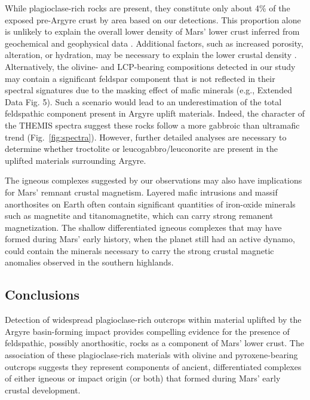 \documentclass[11pt]{article}
\begin{document}
While plagioclase-rich rocks are present, they constitute only about 4\% of the exposed pre-Argyre crust by area based on our detections. This proportion alone is unlikely to explain the overall lower density of Mars' lower crust inferred from geochemical and geophysical data \citep{Baratoux2014, Goossens2017, Knapmeyer-Endrun2021, Drilleau2023, Joshi2023}. Additional factors, such as increased porosity, alteration, or hydration, may be necessary to explain the lower crustal density \citep{Ehlmann2010, Bandfield2013, Sun2015, Wordsworth2017, Goossens2017, Wieczorek2022, Carrasco2023}. Alternatively, the olivine- and LCP-bearing compositions detected in our study may contain a significant feldspar component that is not reflected in their spectral signatures due to the masking effect of mafic minerals (e.g., Extended Data Fig. 5). Such a scenario would lead to an underestimation of the total feldspathic component present in Argyre uplift materials. Indeed, the character of the THEMIS spectra suggest these rocks follow a more gabbroic than ultramafic trend (Fig.~\ref{fig:spectra}). However, further detailed analyses are necessary to determine whether troctolite or leucogabbro/leuconorite are present in the uplifted materials surrounding Argyre.

The igneous complexes suggested by our observations may also have implications for Mars' remnant crustal magnetism. Layered mafic intrusions and massif anorthosites on Earth often contain significant quantities of iron-oxide minerals such as magnetite and titanomagnetite, which can carry strong remanent magnetization. The shallow differentiated igneous complexes that may have formed during Mars' early history, when the planet still had an active dynamo, could contain the minerals necessary to carry the strong crustal magnetic anomalies observed in the southern highlands.

\subsection*{Conclusions}

Detection of widespread plagioclase-rich outcrops within material uplifted by the Argyre basin-forming impact provides compelling evidence for the presence of feldspathic, possibly anorthositic, rocks as a component of Mars' lower crust. The association of these plagioclase-rich materials with olivine and pyroxene-bearing outcrops suggests they represent components of ancient, differentiated complexes of either igneous or impact origin (or both) that formed during Mars' early crustal development.
\end{document}
